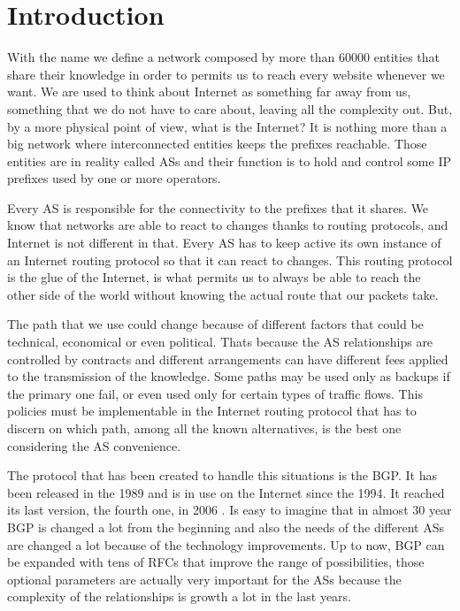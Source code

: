 \chapter{Introduction}
\label{cha:introduction}



With the name  we define a network composed by more than \num{60000}
entities that share their knowledge in order to permits us to reach every website
whenever we want.
We are used to think about Internet as something far away from us, something
that we do not have to care about, leaving all the complexity
out.
But, by a more physical point of view, what is the Internet? It is nothing
more than a big network where interconnected entities keeps the prefixes reachable.
Those entities are in reality called \acp{AS} and their function is to hold and
control some \ac{IP} prefixes used by one or more operators.

Every \ac{AS} is responsible for the connectivity to the prefixes that it shares.
We know that networks are able to react to changes thanks to routing protocols,
and Internet is not different in that.
Every \ac{AS} has to keep active its own instance of an Internet routing protocol
so that it can react to changes.
This routing protocol is the glue of the Internet, is what permits
us to always be able to reach the other side of the world without knowing
the actual route that our packets take.

The path that we use could change because of different factors that could
be technical, economical or even political.
Thats because the \ac{AS} relationships are controlled by contracts and different
arrangements can have different fees applied to the transmission of the knowledge.
Some paths may be used only as backups if the primary one fail, or even used
only for certain types of traffic flows.
This policies must be implementable in the Internet routing protocol that has
to discern on which path, among all the known alternatives, is the best one
considering the \ac{AS} convenience.

The protocol that has been created to handle this situations is the \ac{BGP}.
It has been released in the \num{1989} and is in use on the Internet since
the \num{1994}.
It reached its last version, the fourth one, in \num{2006} \cite{rfc4271}.
Is easy to imagine that in almost \num{30} year \ac{BGP} is changed a lot from
the beginning and also the needs of the different \acp{AS} are changed a lot
because of the technology improvements.
Up to now, \ac{BGP} can be expanded with tens of \acp{RFC} that improve the
range of possibilities, those optional parameters are actually very important
for the \acp{AS} because the complexity of the relationships is growth a lot
in the last years.

